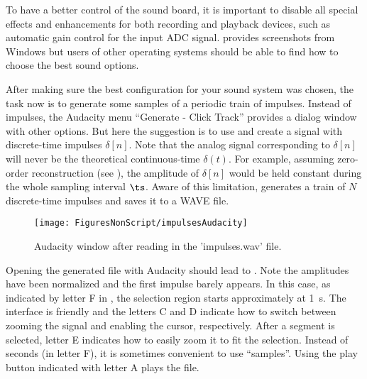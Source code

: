 To have a better control of the sound board, it is important to disable all special effects and enhancements for both recording and playback devices, such as automatic gain control for the input ADC signal.
 provides screenshots from Windows but users of other operating systems should be able to find how to choose the best sound options. 

After making sure the best configuration for your sound system was chosen, the task now is to generate some samples of a periodic train of impulses. Instead of impulses, the Audacity menu ``Generate - Click Track'' provides a dialog window with other options. But here the suggestion is to use {\matlab} and create a signal with  discrete-time impulses $\delta[n]$. Note that the analog signal corresponding to $\delta[n]$ will never be the theoretical continuous-time $\delta(t)$. For example, assuming zero-order reconstruction (see ), the amplitude of $\delta[n]$ would be held constant during the whole sampling interval $\ts$.
Aware of this limitation,  generates a train of $N$ discrete-time impulses and saves it to a WAVE file.

\begin{figure}
	\centering
		\texttt{[image: FiguresNonScript/impulsesAudacity]}
	\caption{Audacity window after reading in the 'impulses.wav' file.\label{fig:impulsesAudacity}}
\end{figure}

Opening the generated file with Audacity should lead to . Note the amplitudes have been normalized and the first impulse barely appears. In this case, as indicated by letter F in , the selection region starts approximately at 1~s. The interface is friendly and the letters C and D indicate how
to switch between zooming the signal and enabling the cursor, respectively.
After a segment is selected, letter E indicates how to easily zoom it to fit the selection. Instead of seconds (in letter F), it is sometimes convenient to use ``samples''. Using the play button indicated with letter A plays the file.

